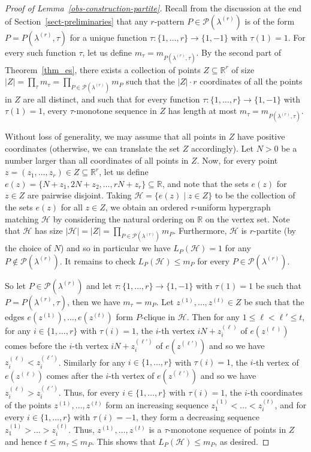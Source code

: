 \documentclass{aic}
\theoremstyle{definition}
\numberwithin{equation}{section}
\numberwithin{figure}{section}
\newcommand{\su}{\subseteq}
\newcommand{\HH}{\mathcal{H}}
\newcommand{\PP}{\mathcal{P}}
\begin{document}
\begin{proof}[Proof of Lemma~\ref{obs-construction-partite}]
    Recall from the discussion at the end of Section~\ref{sect-preliminaries} that any $r$-pattern $P\in \PP(\lambda^{(r)})$ is of the form $P=P(\lambda^{(r)},\tau)$ for a unique function $\tau:\{1,\dots,r\}\to \{1,-1\}$ with $\tau(1)=1$. For every such function $\tau$, let us define $m_\tau=m_{P(\lambda^{(r)},\tau)}$. By the second part of Theorem~\ref{thm_es}, there exists a collection of points $Z\su \mathbb{R}^r$ of size $|Z|=\prod_{\tau} m_{\tau}=\prod_{P\in \PP(\lambda^{(r)})} m_{P}$ such that the $|Z|\cdot r$ coordinates of all the points in $Z$ are all distinct, and such that for every function $\tau:\{1,\dots,r\}\to \{1,-1\}$ with $\tau(1)=1$, every $\tau$-monotone sequence in $Z$ has length at most $m_\tau=m_{P(\lambda^{(r)},\tau)}$.
    
    Without loss of generality, we may assume that all points in $Z$ have positive coordinates (otherwise, we can translate the set $Z$ accordingly). Let $N>0$ be a number larger than all coordinates of all points in $Z$. Now, for every point $z=(z_1,\dots,z_r)\in Z\su \mathbb{R}^r$, let us define $e(z)=\{N+ z_1, 2N + z_2, \ldots, r N+z_r \}\su \mathbb{R}$, and note that the sets $e(z)$ for $z\in Z$ are pairwise disjoint. Taking $\HH=\{e(z)\mid z\in Z\}$ to be the collection of the sets $e(z)$ for all $z\in Z$, we obtain an ordered $r$-uniform hypergraph matching $\HH$ by considering the natural ordering on $\mathbb{R}$ on the vertex set. Note that $\HH$ has size $|\HH|=|Z|=\prod_{P\in \PP(\lambda^{(r)})} m_{P}$. Furthermore, $\HH$ is $r$-partite (by the choice of $N$) and so in particular we have $L_{P}(\HH)=1$ for any $P\not\in \PP(\lambda^{(r)})$. It remains to check $L_{P}(\HH)\le m_P$ for every $P\in \PP(\lambda^{(r)})$.

    So let $P\in \PP(\lambda^{(r)})$ and let $\tau:\{1,\dots,r\}\to \{1,-1\}$ with $\tau(1)=1$ be such that $P=P(\lambda^{(r)},\tau)$, then we have $m_\tau=m_P$. Let $z^{(1)},\dots,z^{(t)}\in Z$ be such that the edges $e(z^{(1)}),\dots,e(z^{(t)})$ form $P$-clique in $\HH$. Then for any $1\le \ell<\ell'\le t$, for any $i\in \{1,\dots,r\}$ with $\tau(i)=1$, the $i$-th vertex $iN+z^{(\ell)}_i$ of $e(z^{(\ell)})$ comes before the $i$-th vertex $iN+z^{(\ell')}_i$ of $e(z^{(\ell')})$ and so we have $z^{(\ell)}_i<z^{(\ell')}_i$. Similarly for any $i\in \{1,\dots,r\}$ with $\tau(i)=1$, the $i$-th vertex of $e(z^{(\ell)})$ comes after the $i$-th vertex of $e(z^{(\ell')})$ and so we have $z^{(\ell)}_i>z^{(\ell')}_i$. Thus, for every $i\in \{1,\dots,r\}$ with $\tau(i)=1$, the $i$-th coordinates of the points $z^{(1)},\dots,z^{(t)}$ form an increasing sequence 
    $z^{(1)}_1<\dots<z^{(t)}_i$, and for every $i\in \{1,\dots,r\}$ with $\tau(i)=-1$, they form a decreasing sequence $z^{(1)}_1>\dots>z^{(t)}_i$. Thus, $z^{(1)},\dots,z^{(t)}$ is a $\tau$-monotone sequence of points in $Z$ and hence $t\le m_\tau\le m_P$. This shows that $L_P(\HH)\le m_P$, as desired.
\end{proof}
\end{document}
